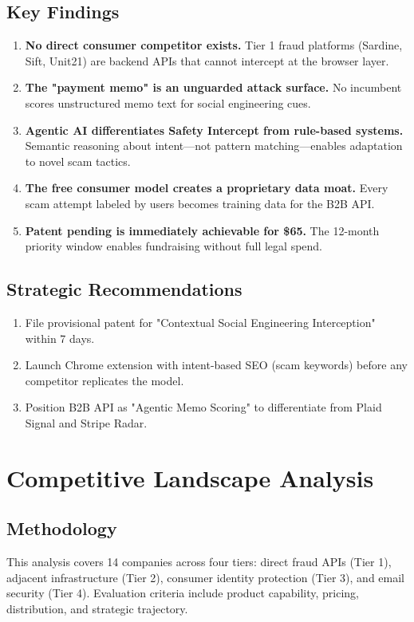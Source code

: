 \documentclass[12pt]{article}
\begin{document}
\subsection{Key Findings}
\begin{enumerate}
    \item \textbf{No direct consumer competitor exists.} Tier 1 fraud platforms (Sardine, Sift, Unit21) are backend APIs that cannot intercept at the browser layer.
    \item \textbf{The "payment memo" is an unguarded attack surface.} No incumbent scores unstructured memo text for social engineering cues.
    \item \textbf{Agentic AI differentiates Safety Intercept from rule-based systems.} Semantic reasoning about intent—not pattern matching—enables adaptation to novel scam tactics.
    \item \textbf{The free consumer model creates a proprietary data moat.} Every scam attempt labeled by users becomes training data for the B2B API.
    \item \textbf{Patent pending is immediately achievable for \$65.} The 12-month priority window enables fundraising without full legal spend.
\end{enumerate}

\subsection{Strategic Recommendations}
\begin{enumerate}
    \item File provisional patent for "Contextual Social Engineering Interception" within 7 days.
    \item Launch Chrome extension with intent-based SEO (scam keywords) before any competitor replicates the model.
    \item Position B2B API as "Agentic Memo Scoring" to differentiate from Plaid Signal and Stripe Radar.
\end{enumerate}

\newpage
\section{Competitive Landscape Analysis}

\subsection{Methodology}
This analysis covers 14 companies across four tiers: direct fraud APIs (Tier 1), adjacent infrastructure (Tier 2), consumer identity protection (Tier 3), and email security (Tier 4). Evaluation criteria include product capability, pricing, distribution, and strategic trajectory.
\end{document}
